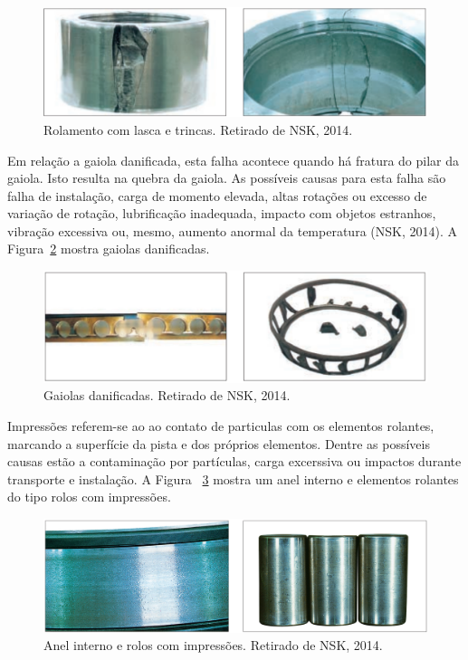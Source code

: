 \documentclass[
	12pt,				
	oneside,			
	a4paper,			
	english,			
	brazil,			
	]{abntex2ppgsi}
\begin{document}
\begin{figure}[H]
\centering
\includegraphics[width=\textwidth,height=\textheight,keepaspectratio]{trinca_nsk}
\caption {Rolamento com lasca e trincas. Retirado de NSK, 2014.}
\label{trinca_nsk}
\end{figure}

Em relação a gaiola danificada, esta falha acontece quando há fratura do pilar da gaiola. Isto resulta na quebra da gaiola. As possíveis causas para esta falha são falha de instalação, carga de momento elevada, altas rotações ou excesso de variação de rotação, lubrificação inadequada, impacto com objetos estranhos, vibração excessiva ou, mesmo, aumento anormal da temperatura (NSK, 2014). A Figura~\ref{gaiola_nsk} mostra gaiolas danificadas. 

\begin{figure}[H]
\centering
\includegraphics[width=\textwidth,height=\textheight,keepaspectratio]{gaiola_nsk}
\caption {Gaiolas danificadas. Retirado de NSK, 2014.}
\label{gaiola_nsk}
\end{figure}

Impressões referem-se ao ao contato de particulas com os elementos rolantes, marcando a superfície da pista e dos próprios elementos. Dentre as possíveis causas estão a contaminação por partículas, carga excerssiva ou impactos durante transporte e instalação. A Figura ~\ref{impressoes_nsk} mostra um anel interno e elementos rolantes do tipo rolos com impressões.

\begin{figure}[H]
\centering
\includegraphics[width=\textwidth,height=\textheight,keepaspectratio]{impressoes_nsk}
\caption {Anel interno e rolos com impressões. Retirado de NSK, 2014.}
\label{impressoes_nsk}
\end{figure}
\end{document}
